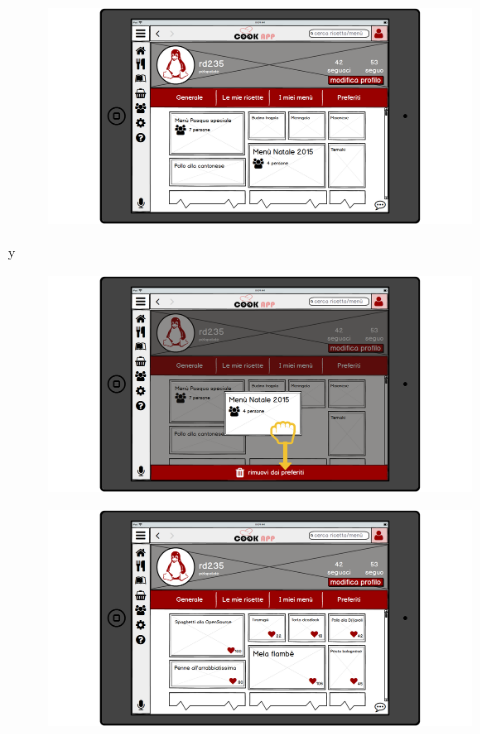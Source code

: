 \begin{figure}[H]
	\centering
	\includegraphics[width=0.95\linewidth]{img/mockup/Profilo-preferiti.png}
\end{figure}
y\begin{figure}[H]
	\centering
	\includegraphics[width=0.95\linewidth]{img/mockup/Profilo-preferiti2.png}
\end{figure}
\begin{figure}[H]
	\centering
	\includegraphics[width=0.95\linewidth]{img/mockup/Profilo-ricette.png}
\end{figure}
